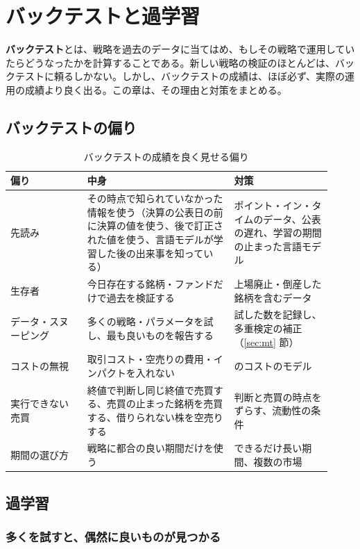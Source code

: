 \chapter{バックテストと過学習}
\label{ch:backtest}

\textbf{バックテスト}とは、戦略を過去のデータに当てはめ、もしその戦略で運用していたらどうなったかを計算することである。新しい戦略の検証のほとんどは、バックテストに頼るしかない。しかし、バックテストの成績は、ほぼ必ず、実際の運用の成績より良く出る。この章は、その理由と対策をまとめる。

\section{バックテストの偏り}

\begin{table}[H]
\centering\small
\caption{バックテストの成績を良く見せる偏り}
\label{tab:biases}
\begin{tabular}{@{}P{0.22\linewidth}P{0.42\linewidth}P{0.28\linewidth}@{}}
\toprule
偏り & 中身 & 対策 \\
\midrule
先読み & その時点で知られていなかった情報を使う（決算の公表日の前に決算の値を使う、後で訂正された値を使う、言語モデルが学習した後の出来事を知っている） & ポイント・イン・タイムのデータ、公表の遅れ、学習の期間の止まった言語モデル \\
生存者 & 今日存在する銘柄・ファンドだけで過去を検証する & 上場廃止・倒産した銘柄を含むデータ \\
データ・スヌーピング & 多くの戦略・パラメータを試し、最も良いものを報告する & 試した数を記録し、多重検定の補正（\ref{sec:mt} 節） \\
コストの無視 & 取引コスト・空売りの費用・インパクトを入れない &  のコストのモデル \\
実行できない売買 & 終値で判断し同じ終値で売買する、売買の止まった銘柄を売買する、借りられない株を空売りする & 判断と売買の時点をずらす、流動性の条件 \\
期間の選び方 & 戦略に都合の良い期間だけを使う & できるだけ長い期間、複数の市場 \\
\bottomrule
\end{tabular}
\end{table}

\section{過学習}

\subsection{多くを試すと、偶然に良いものが見つかる}

